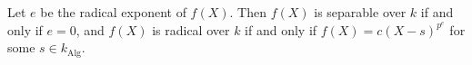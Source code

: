 Let $e$ be the radical exponent of $f(X)$. Then $f(X)$ is separable over $k$ if and only if $e = 0$, and $f(X)$ is radical over $k$ if and only if $f(X) = c(X - s)^{p^e}$ for some $s \in k_{\text{Alg}}$.
